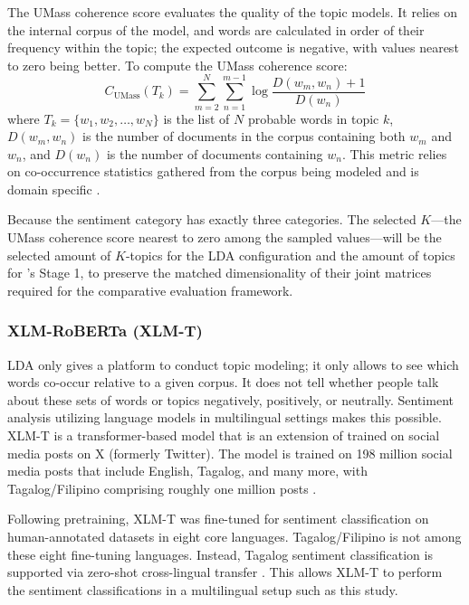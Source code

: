 The UMass coherence score evaluates the quality of the topic models. It relies
on the internal corpus of the model, and words are calculated in order of their
frequency within the topic; the expected outcome is negative, with values
nearest to zero being better. To compute the UMass coherence score:
\begin{equation}
	C_{\mathrm{UMass}}(T_k)
	= \sum_{m=2}^{N} \sum_{n=1}^{m-1}
	\log \frac{D(w_m, w_n) + 1}{D(w_n)}
	\label{eq:umass}
\end{equation}
where $T_k = \{w_1, w_2, \dots, w_N\}$ is the list of $N$ probable words in
topic $k$, $D(w_m, w_n)$ is the number of documents in the corpus containing
both $w_m$ and $w_n$, and $D(w_n)$ is the number of documents containing $w_n$.
This metric relies on co-occurrence statistics gathered from the corpus being
modeled and is domain specific \parencite{mimno2011}.

Because the sentiment category has exactly three categories. The selected $K$---the UMass coherence score nearest to
zero among the sampled values---will be the selected amount of $K$-topics for
the LDA configuration and the amount of topics for \sysB's Stage 1, to preserve
the matched dimensionality of their joint matrices required for the comparative
evaluation framework.

\subsubsection{XLM-RoBERTa (XLM-T)}

LDA only gives a platform to conduct topic modeling; it only
allows to see which words co-occur relative to a given corpus. It does not
tell whether people talk about these sets of words or topics negatively,
positively, or neutrally. Sentiment analysis utilizing language models in
multilingual settings makes this possible. XLM-T is a transformer-based model
that is an extension of \xlmr{} trained on social media posts on X (formerly
Twitter). The model is trained on 198 million social media posts that include
English, Tagalog, and many more, with Tagalog/Filipino comprising roughly one
million posts \parencite{barbieri2021}.

Following pretraining, XLM-T was fine-tuned for sentiment classification on
human-annotated datasets in eight core languages. Tagalog/Filipino is not among
these eight fine-tuning languages. Instead, Tagalog sentiment classification is
supported via zero-shot cross-lingual transfer \parencite{barbieri2021}. This allows XLM-T to perform the sentiment classifications in a multilingual setup such as this study.

